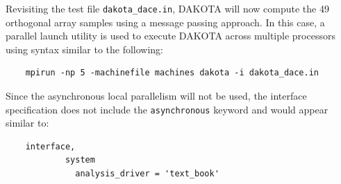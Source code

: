 Revisiting the test file \texttt{dakota\_dace.in}, DAKOTA will now
compute the 49 orthogonal array samples using a message passing
approach.  In this case, a parallel launch utility is used to execute
DAKOTA across multiple processors using syntax similar to the following:
\begin{small}
\begin{verbatim}
    mpirun -np 5 -machinefile machines dakota -i dakota_dace.in
\end{verbatim}
\end{small}

Since the asynchronous local parallelism will not be used, the
interface specification does not include the \texttt{asynchronous}
keyword and would appear similar to:
\begin{small}
\begin{verbatim}
    interface,
            system
              analysis_driver = 'text_book'
\end{verbatim}
\end{small}

